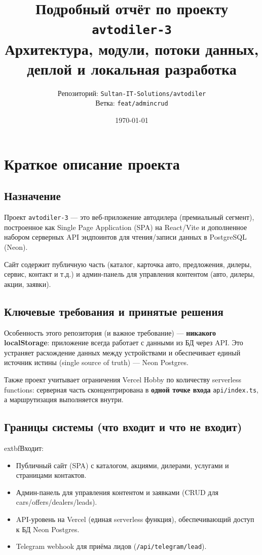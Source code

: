 \documentclass[12pt,a4paper]{article}
\title{\textbf{Подробный отчёт по проекту \texttt{avtodiler-3}}\\[4pt]
\large Архитектура, модули, потоки данных, деплой и локальная разработка}
\author{Репозиторий: \texttt{Sultan-IT-Solutions/avtodiler}\\Ветка: \texttt{feat/admincrud}}
\date{\today}
\begin{document}
\maketitle

\tableofcontents
\newpage

\section{Краткое описание проекта}
\subsection{Назначение}
Проект \texttt{avtodiler-3} --- это веб-приложение автодилера (премиальный сегмент), построенное как Single Page Application (SPA) на React/Vite и дополненное набором серверных API эндпоинтов для чтения/записи данных в PostgreSQL (Neon).

Сайт содержит публичную часть (каталог, карточка авто, предложения, дилеры, сервис, контакт и т.д.) и админ-панель для управления контентом (авто, дилеры, акции, заявки).

\subsection{Ключевые требования и принятые решения}
Особенность этого репозитория (и важное требование) --- \textbf{никакого localStorage}: приложение всегда работает с данными из БД через API. Это устраняет расхождение данных между устройствами и обеспечивает единый источник истины (single source of truth) --- Neon Postgres.

Также проект учитывает ограничения Vercel Hobby по количеству serverless functions: серверная часть сконцентрирована в \textbf{одной точке входа} \texttt{api/index.ts}, а маршрутизация выполняется внутри.

\subsection{Границы системы (что входит и что не входит)}
	extbf{Входит:}
\begin{itemize}[leftmargin=18pt]
  \item Публичный сайт (SPA) с каталогом, акциями, дилерами, услугами и страницами контактов.
  \item Админ-панель для управления контентом и заявками (CRUD для cars/offers/dealers/leads).
  \item API-уровень на Vercel (единая serverless функция), обеспечивающий доступ к БД Neon Postgres.
  \item Telegram webhook для приёма лидов (\texttt{/api/telegram/lead}).
\end{itemize}
\end{document}
